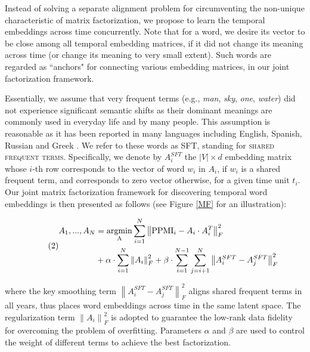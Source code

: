 \documentclass[output=paper]{langsci/langscibook}
\begin{document}
Instead of solving a separate alignment problem for circumventing the non-unique characteristic of matrix factorization, we propose to learn the temporal embeddings across time concurrently. Note that for a word, we desire its vector to be close among all temporal embedding matrices, if it did not change its meaning across time (or change its meaning to very small extent). Such words are regarded as ``anchors" for connecting various embedding matrices, in our joint factorization framework. 

Essentially, we assume that very frequent terms (e.g., \textit{man}, \textit{sky}, \textit{one}, \textit{water}) did not experience significant semantic shifts as their dominant meanings are commonly used in everyday life and by many people. This assumption is reasonable as it has been reported in many languages including English, Spanish, Russian and Greek \citep{lieberman2007quantifying,pagel2007frequency}. We refer to these words as SFT, 
standing for \textsc{shared frequent terms}. 
Specifically, we denote by $A_{i}^{SFT}$ the $|V| \times d$ embedding matrix whose $i$-th row corresponds to the vector of word $w_{i}$ in $A_{i}$, if $w_{i}$ is a shared frequent term, and corresponds to zero vector otherwise, for a given time unit $t_{i}$. Our joint matrix factorization framework for discovering temporal word embeddings is then presented as follows (see Figure \ref{MF} for an illustration):\largerpage[-1]

\begin{equation}\tag{2}
\begin{aligned}
A_{1}, ..., A_{N} &= \operatorname{\underset{A}{argmin}}\sum_{i = 1}^{N}\left \|\textup{PPMI}_{i} - A_{i}\cdot A_{i}^{T}  \right \|_{F}^{2} \\&+ \alpha \cdot \sum_{i = 1}^{N}\left \| A_{i} \right \|_{F}^{2} + \beta \cdot \sum_{i = 1}^{N - 1}\sum_{j = i + 1}^{N}\left \| A_{i}^{SFT} -  A_{j}^{SFT}\right \|_{F}^{2}
\label{factorization}
\end{aligned}
\end{equation}

where the key smoothing term $\left \| A_{i}^{SFT} -  A_{j}^{SFT}\right \|_{F}^{2}$ aligns shared frequent terms in all years, thus places word embeddings across time in the same latent space. The regularization term $\left \| A_{i} \right \|_{F}^{2}$ is adopted to guarantee the low-rank data fidelity for overcoming the problem of overfitting. Parameters $\alpha$ and $\beta$ are used to control the weight of different terms to achieve the best factorization.
\end{document}
